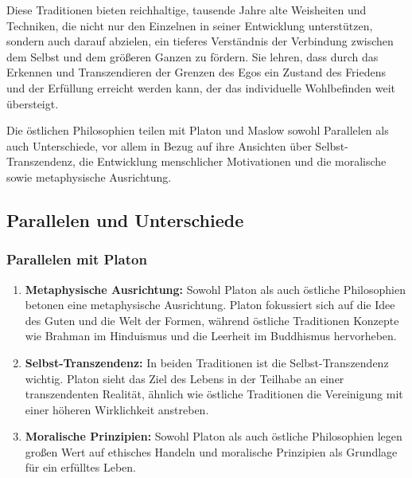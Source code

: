 \documentclass[12pt,a4paper]{article}
\begin{document}
Diese Traditionen bieten reichhaltige, tausende Jahre alte Weisheiten und Techniken, die nicht nur den Einzelnen in seiner Entwicklung unterstützen, sondern auch darauf abzielen, ein tieferes Verständnis der Verbindung zwischen dem Selbst und dem größeren Ganzen zu fördern. Sie lehren, dass durch das Erkennen und Transzendieren der Grenzen des Egos ein Zustand des Friedens und der Erfüllung erreicht werden kann, der das individuelle Wohlbefinden weit übersteigt.

Die östlichen Philosophien teilen mit Platon und Maslow sowohl Parallelen als auch Unterschiede, vor allem in Bezug auf ihre Ansichten über Selbst-Transzendenz, die Entwicklung menschlicher Motivationen und die moralische sowie metaphysische Ausrichtung.

\subsection[short]{Parallelen und Unterschiede}

\subsubsection*{Parallelen mit Platon}
\begin{enumerate}
  \item \textbf{Metaphysische Ausrichtung:} Sowohl Platon als auch östliche Philosophien betonen eine metaphysische Ausrichtung. Platon fokussiert sich auf die Idee des Guten und die Welt der Formen, während östliche Traditionen Konzepte wie Brahman im Hinduismus und die Leerheit im Buddhismus hervorheben.
  \item \textbf{Selbst-Transzendenz:} In beiden Traditionen ist die Selbst-Transzendenz wichtig. Platon sieht das Ziel des Lebens in der Teilhabe an einer transzendenten Realität, ähnlich wie östliche Traditionen die Vereinigung mit einer höheren Wirklichkeit anstreben.
  \item \textbf{Moralische Prinzipien:} Sowohl Platon als auch östliche Philosophien legen großen Wert auf ethisches Handeln und moralische Prinzipien als Grundlage für ein erfülltes Leben.
\end{enumerate}
\end{document}
